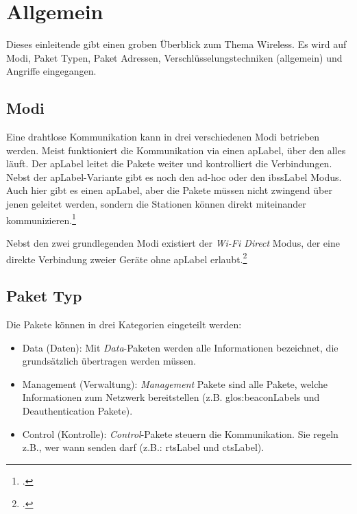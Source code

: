 
\chapter{Allgemein}
\label{ch:general}
Dieses einleitende  gibt einen groben Überblick zum Thema Wireless. Es wird auf Modi, Paket Typen, Paket Adressen, Verschlüsselungstechniken (allgemein) und Angriffe eingegangen.

\section{Modi}
Eine drahtlose Kommunikation kann in drei verschiedenen Modi betrieben werden.
Meist funktioniert die Kommunikation via einen \gls{apLabel}, über den alles läuft. Der \gls{apLabel} leitet die Pakete weiter und kontrolliert die Verbindungen.
Nebst der \gls{apLabel}-Variante gibt es noch den ad-hoc oder den \gls{ibssLabel} Modus. Auch hier gibt es einen \gls{apLabel}, aber die Pakete müssen nicht zwingend über jenen geleitet werden, sondern die Stationen können direkt miteinander kommunizieren.\footcite[][38]{WrightCache201503}

Nebst den zwei grundlegenden Modi existiert der \textit{Wi-Fi Direct} Modus, der eine direkte Verbindung zweier Geräte ohne \gls{apLabel} erlaubt.\footcite{WiFi_Direct_Wikipedia_the_free_encyclopedia_2015-04-17}

\section{Paket Typ}
Die Pakete können in drei Kategorien eingeteilt werden:
\begin{itemize}
	\item Data (Daten): Mit \textit{Data}-Paketen werden alle Informationen bezeichnet, die grundsätzlich übertragen werden müssen.
	\item Management (Verwaltung): \textit{Management} Pakete sind alle Pakete, welche Informationen zum Netzwerk bereitstellen (z.B. \glspl{glos:beaconLabel} und Deauthentication Pakete).
	\item Control (Kontrolle): \textit{Control}-Pakete steuern die Kommunikation. Sie regeln z.B., wer wann senden darf (z.B.: \gls{rtsLabel} und \gls{ctsLabel}).
\end{itemize}

